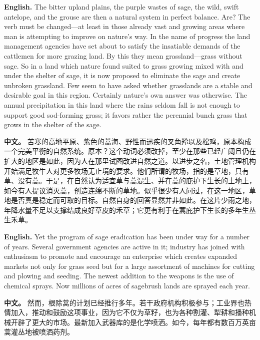 \noindent\textbf{English.} The bitter upland plains, the purple wastes of sage, the wild, swift antelope, and the grouse are then a natural system in perfect balance. Are? The verb must be changed---at least in those already vast and growing areas where man is attempting to improve on nature's way. In the name of progress the land management agencies have set about to satisfy the insatiable demands of the cattlemen for more grazing land. By this they mean grassland---grass without sage. So in a land which nature found suited to grass growing mixed with and under the shelter of sage, it is now proposed to eliminate the sage and create unbroken grassland. Few seem to have asked whether grasslands are a stable and desirable goal in this region. Certainly nature's own answer was otherwise. The annual precipitation in this land where the rains seldom fall is not enough to support good sod-forming grass; it favors rather the perennial bunch grass that grows in the shelter of the sage.
\par
\noindent\textbf{中文。} 苦寒的高地平原、紫色的蒿海、野性而迅疾的叉角羚以及松鸡，原本构成一个完美平衡的自然系统。原本？这个动词必须改掉，至少在那些已经广阔且仍在扩大的地区是如此，因为人在那里试图改进自然之道。以进步之名，土地管理机构开始满足牧牛人对更多牧场无止境的要求。他们所谓的牧场，指的是草地，只有草、没有蒿。于是，在自然认为适宜草与蒿混生、并在蒿的庇护下生长的土地上，如今有人提议消灭蒿，创造连绵不断的草地。似乎很少有人问过，在这一地区，草地是否真是稳定而可取的目标。自然自身的回答显然并非如此。在这片少雨之地，年降水量不足以支撑结成良好草皮的禾草；它更有利于在蒿庇护下生长的多年生丛生禾草。
\par\medskip

\noindent\textbf{English.} Yet the program of sage eradication has been under way for a number of years. Several government agencies are active in it; industry has joined with enthusiasm to promote and encourage an enterprise which creates expanded markets not only for grass seed but for a large assortment of machines for cutting and plowing and seeding. The newest addition to the weapons is the use of chemical sprays. Now millions of acres of sagebrush lands are sprayed each year.
\par
\noindent\textbf{中文。} 然而，根除蒿的计划已经推行多年。若干政府机构积极参与；工业界也热情加入，推动和鼓励这项事业，因为它不仅为草籽，也为各种割灌、犁耕和播种机械开辟了更大的市场。最新加入武器库的是化学喷洒。如今，每年都有数百万英亩蒿灌丛地被喷洒药剂。
\par\medskip

